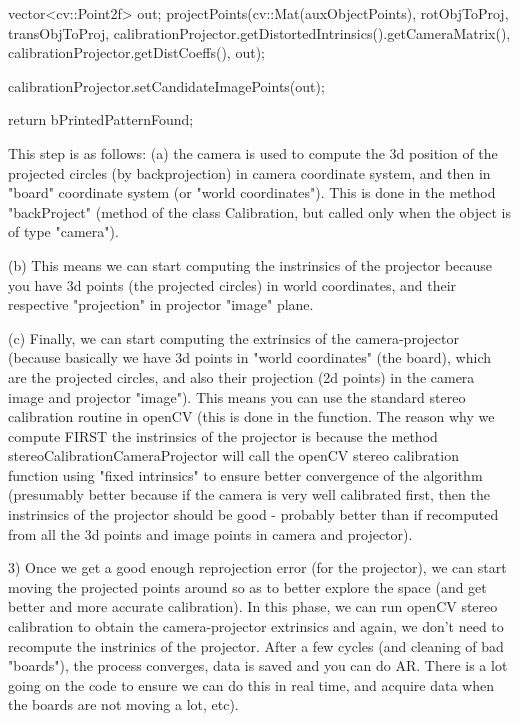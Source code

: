 \begin{listing}[
  float=ht,
  language = C++,
  caption  = {Atributos de la clase Demo},
  label    = code:Demo]
{{      vector<cv::Point2f> out;
      projectPoints(cv::Mat(auxObjectPoints),
                    rotObjToProj, transObjToProj,
                    calibrationProjector.getDistortedIntrinsics().getCameraMatrix(),
                    calibrationProjector.getDistCoeffs(),
                    out);
    
      calibrationProjector.setCandidateImagePoints(out);
    }
  
    return bPrintedPatternFound;
  }

\end{listing}
This step is as follows: (a) the camera is used to compute the 3d position of the projected circles (by backprojection) in camera coordinate system, and then in "board" coordinate system (or "world coordinates"). This is done in the method "backProject" (method of the class Calibration, but called only when the object is of type "camera").

 (b) This means we can start computing the instrinsics of the projector because you have 3d points (the projected circles) in world coordinates, and their respective "projection" in projector "image" plane. 

(c) Finally, we can start computing the extrinsics of the camera-projector (because basically we have 3d points in "world coordinates" (the board), which are the projected circles, and also their projection (2d points) in the camera image and projector "image"). This means you can use the standard stereo calibration routine in openCV (this is done in the function. The reason why we compute FIRST the instrinsics of the projector is because the method stereoCalibrationCameraProjector will call the openCV stereo calibration function using "fixed intrinsics" to ensure better convergence of the algorithm (presumably better because if the camera is very well calibrated first, then the instrinsics of the projector should be good - probably better than if recomputed from all the 3d points and image points in camera and projector).

3) Once we get a good enough reprojection error (for the projector), we can start moving the projected points around so as to better explore the space (and get better and more accurate calibration). In this phase, we can run openCV stereo calibration to obtain the camera-projector extrinsics and again, we don't need to recompute the instrinics of the projector. After a few cycles (and cleaning of bad "boards"), the process converges, data is saved and you can do AR.
There is a lot going on the code to ensure we can do this in real time, and acquire data when the boards are not moving a lot, etc).



